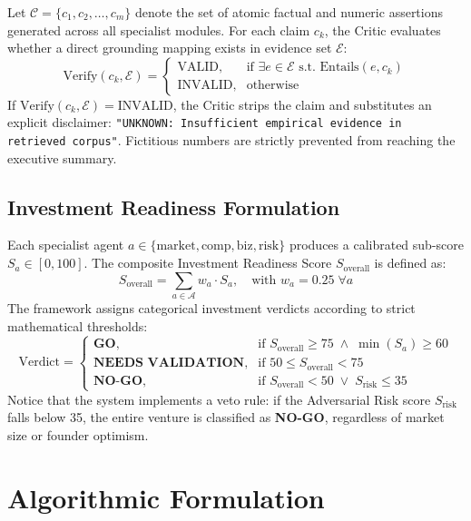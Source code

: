 \documentclass[conference]{IEEEtran}
\begin{document}
Let $\mathcal{C} = \{c_1, c_2, \dots, c_m\}$ denote the set of atomic factual and numeric assertions generated across all specialist modules. For each claim $c_k$, the Critic evaluates whether a direct grounding mapping exists in evidence set $\mathcal{E}$:
\begin{equation}
\text{Verify}(c_k, \mathcal{E}) = \begin{cases}
\text{VALID}, & \text{if } \exists e \in \mathcal{E} \text{ s.t. } \text{Entails}(e, c_k) \\
\text{INVALID}, & \text{otherwise}
\end{cases}
\end{equation}
If $\text{Verify}(c_k, \mathcal{E}) = \text{INVALID}$, the Critic strips the claim and substitutes an explicit disclaimer: \texttt{"UNKNOWN: Insufficient empirical evidence in retrieved corpus"}. Fictitious numbers are strictly prevented from reaching the executive summary.

\subsection{Investment Readiness Formulation}
Each specialist agent $a \in \{\text{market}, \text{comp}, \text{biz}, \text{risk}\}$ produces a calibrated sub-score $S_a \in [0, 100]$. The composite Investment Readiness Score $S_{\text{overall}}$ is defined as:
\begin{equation}
S_{\text{overall}} = \sum_{a \in \mathcal{A}} w_a \cdot S_a, \quad \text{with } w_a = 0.25 \; \forall a
\end{equation}
The framework assigns categorical investment verdicts according to strict mathematical thresholds:
\begin{equation}
\text{Verdict} = \begin{cases}
\textbf{GO}, & \text{if } S_{\text{overall}} \ge 75 \;\land\; \min(S_a) \ge 60 \\
\textbf{NEEDS VALIDATION}, & \text{if } 50 \le S_{\text{overall}} < 75 \\
\textbf{NO-GO}, & \text{if } S_{\text{overall}} < 50 \;\lor\; S_{\text{risk}} \le 35
\end{cases}
\end{equation}
Notice that the system implements a veto rule: if the Adversarial Risk score $S_{\text{risk}}$ falls below 35, the entire venture is classified as \textbf{NO-GO}, regardless of market size or founder optimism.

\section{Algorithmic Formulation}
\end{document}
